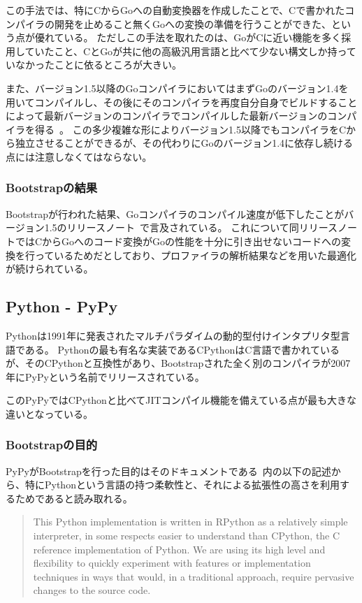 この手法では、特にCからGoへの自動変換器を作成したことで、Cで書かれたコンパイラの開発を止めること無くGoへの変換の準備を行うことができた、という点が優れている。
ただしこの手法を取れたのは、GoがCに近い機能を多く採用していたこと、CとGoが共に他の高級汎用言語と比べて少ない構文しか持っていなかったことに依るところが大きい。

また、バージョン1.5以降のGoコンパイラにおいてはまずGoのバージョン1.4を用いてコンパイルし、その後にそのコンパイラを再度自分自身でビルドすることによって最新バージョンのコンパイラでコンパイルした最新バージョンのコンパイラを得る~\cite{go-bootstrap-plan}。
この多少複雑な形によりバージョン1.5以降でもコンパイラをCから独立させることができるが、その代わりにGoのバージョン1.4に依存し続ける点には注意しなくてはならない。

\subsubsection{Bootstrapの結果}

Bootstrapが行われた結果、Goコンパイラのコンパイル速度が低下したことがバージョン1.5のリリースノート~\cite{go-15-release}で言及されている。
これについて同リリースノートではCからGoへのコード変換がGoの性能を十分に引き出せないコードへの変換を行っているためだとしており、プロファイラの解析結果などを用いた最適化が続けられている。


\subsection{Python - PyPy}
\label{side-effect:instance:python}

Pythonは1991年に発表されたマルチパラダイムの動的型付けインタプリタ型言語である。
Pythonの最も有名な実装であるCPythonはC言語で書かれているが、そのCPythonと互換性があり、Bootstrapされた全く別のコンパイラが2007年にPyPyという名前でリリースされている。

このPyPyではCPythonと比べてJITコンパイル機能を備えている点が最も大きな違いとなっている。

\subsubsection{Bootstrapの目的}

PyPyがBootstrapを行った目的はそのドキュメントである~\cite{pypy-doc}内の以下の記述から、特にPythonという言語の持つ柔軟性と、それによる拡張性の高さを利用するためであると読み取れる。

\begin{quotation}
This Python implementation is written in RPython as a relatively simple interpreter, in some respects easier to understand than CPython, the C reference implementation of Python. We are using its high level and flexibility to quickly experiment with features or implementation techniques in ways that would, in a traditional approach, require pervasive changes to the source code.
\end{quotation}


